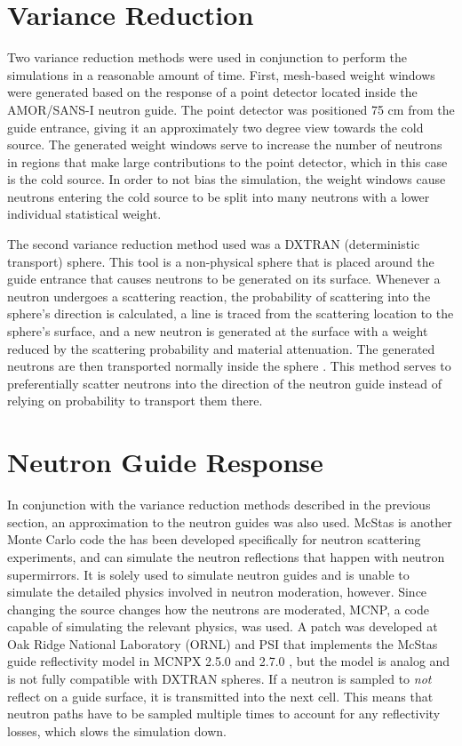 \documentclass[preprint,12pt]{elsarticle}
\begin{document}
\section{Variance Reduction}

Two variance reduction methods were used in conjunction to perform the simulations in a reasonable amount of time.  First, mesh-based weight windows were generated based on the response of a point detector located inside the AMOR/SANS-I neutron guide.  The point detector was positioned 75 cm from the guide entrance, giving it an approximately two degree view towards the cold source.  The generated weight windows serve to increase the number of neutrons in regions that make large contributions to the point detector, which in this case is the cold source. In order to not bias the simulation, the weight windows cause neutrons entering the cold source to be split into many neutrons with a lower individual statistical weight.  

The second variance reduction method used was a DXTRAN (deterministic transport) sphere.    This tool is a non-physical sphere that is placed around the guide entrance that causes neutrons to be generated on its surface.  Whenever a neutron undergoes a scattering reaction, the probability of scattering into the sphere's direction is calculated, a line is traced from the scattering location to the sphere's surface, and a new neutron is generated at the surface with a weight reduced by the scattering probability and material attenuation.  The generated neutrons are then transported normally inside the sphere \cite{mcnp5,mcnp6}.  This method serves to preferentially scatter neutrons into the direction of the neutron guide instead of relying on probability to transport them there.

\section{Neutron Guide Response} 

In conjunction with the variance reduction methods described in the previous section, an approximation to the neutron guides was also used.  McStas is another Monte Carlo code the has been developed specifically for neutron scattering experiments, and can simulate the neutron reflections that happen with neutron supermirrors.  It is solely used to simulate neutron guides and is unable to simulate the detailed physics involved in neutron moderation, however.  Since changing the source changes how the neutrons are moderated, MCNP, a code capable of simulating the relevant physics, was used.  A patch was developed at Oak Ridge National Laboratory (ORNL) and PSI that implements the McStas guide reflectivity model in MCNPX 2.5.0 and 2.7.0 \cite{mcnp_reflectivity, EK_reflectivity}, but the model is analog and is not fully compatible with DXTRAN spheres.  If a neutron is sampled to \emph{not} reflect on a guide surface, it is transmitted into the next cell.  This means that neutron paths have to be sampled multiple times to account for any reflectivity losses, which slows the simulation down.  
\end{document}
